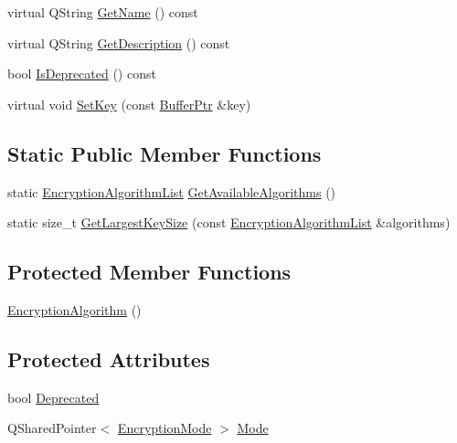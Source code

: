 \begin{DoxyCompactItemize}
\item 
virtual Q\+String \hyperlink{class_gost_crypt_1_1_volume_1_1_encryption_algorithm_a12f1129d74f1ed33b4ee2e871f30a44a}{Get\+Name} () const
\item 
virtual Q\+String \hyperlink{class_gost_crypt_1_1_volume_1_1_encryption_algorithm_a4d23c10182107ac8357baf3f9db0d43d}{Get\+Description} () const
\item 
bool \hyperlink{class_gost_crypt_1_1_volume_1_1_encryption_algorithm_a115757d1b9e3a2aa9b26c4b7c25c56e8}{Is\+Deprecated} () const
\item 
virtual void \hyperlink{class_gost_crypt_1_1_volume_1_1_encryption_algorithm_ae0fabca2d13ee8bdfad1e27d8babd803}{Set\+Key} (const \hyperlink{class_gost_crypt_1_1_buffer_ptr}{Buffer\+Ptr} \&key)
\end{DoxyCompactItemize}
\subsection*{Static Public Member Functions}
\begin{DoxyCompactItemize}
\item 
static \hyperlink{namespace_gost_crypt_1_1_volume_ae58c307b345c639d35f6dc68af4017b5}{Encryption\+Algorithm\+List} \hyperlink{class_gost_crypt_1_1_volume_1_1_encryption_algorithm_a3f49b2daf79e824c726ec7b62fa1e926}{Get\+Available\+Algorithms} ()
\item 
static size\+\_\+t \hyperlink{class_gost_crypt_1_1_volume_1_1_encryption_algorithm_a37bd15a6974f6685c8edb3a07da009dc}{Get\+Largest\+Key\+Size} (const \hyperlink{namespace_gost_crypt_1_1_volume_ae58c307b345c639d35f6dc68af4017b5}{Encryption\+Algorithm\+List} \&algorithms)
\end{DoxyCompactItemize}
\subsection*{Protected Member Functions}
\begin{DoxyCompactItemize}
\item 
\hyperlink{class_gost_crypt_1_1_volume_1_1_encryption_algorithm_ad56592dedd6694a925c57da3aa96ca40}{Encryption\+Algorithm} ()
\end{DoxyCompactItemize}
\subsection*{Protected Attributes}
\begin{DoxyCompactItemize}
\item 
bool \hyperlink{class_gost_crypt_1_1_volume_1_1_encryption_algorithm_aa6a4d985e35af681d88f813f082a0657}{Deprecated}
\item 
Q\+Shared\+Pointer$<$ \hyperlink{class_gost_crypt_1_1_volume_1_1_encryption_mode}{Encryption\+Mode} $>$ \hyperlink{class_gost_crypt_1_1_volume_1_1_encryption_algorithm_a033ffbc7a4ff80377102654cff207b66}{Mode}
\end{DoxyCompactItemize}


